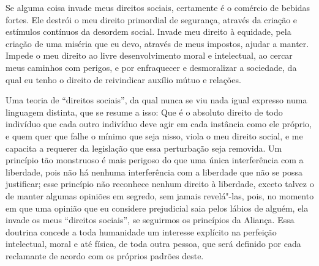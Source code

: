 \begin{hedraquote}
Se alguma coisa invade meus direitos sociais, certamente é o comércio de
bebidas fortes. Ele destrói o meu direito primordial de segurança,
através da criação e estímulos contínuos da desordem social. Invade meu
direito à equidade, pela criação de uma miséria que eu devo, através de
meus impostos, ajudar a manter. Impede o meu direito ao livre
desenvolvimento moral e intelectual, ao cercar meus caminhos com
perigos, e por enfraquecer e desmoralizar a sociedade, da qual eu tenho
o direito de reivindicar auxílio mútuo e relações. 
\end{hedraquote}

Uma teoria de ``direitos sociais'', da qual nunca se viu nada igual expresso numa
linguagem distinta, que se resume a isso: Que é o absoluto direito de
todo indivíduo que cada outro indivíduo deve agir em cada instância
como ele próprio, e quem quer que falhe o mínimo que seja nisso, viola
o meu direito social, e me capacita a requerer da legislação que essa
perturbação seja removida. Um princípio tão monstruoso é mais perigoso
do que uma única interferência com a liberdade, pois não há nenhuma
interferência com a liberdade que não se possa justificar; esse princípio
não reconhece nenhum direito à liberdade, exceto talvez o de manter
algumas opiniões em segredo, sem jamais revelá"-las, pois, no momento
em que uma opinião que eu considere prejudicial saia pelos lábios de
alguém, ela invade os meus ``direitos sociais'', se seguirmos os
princípios da Aliança. Essa doutrina concede a toda humanidade um
interesse explícito na perfeição intelectual, moral e até física, de
toda outra pessoa, que será definido por cada reclamante de acordo com
os próprios padrões deste. 

